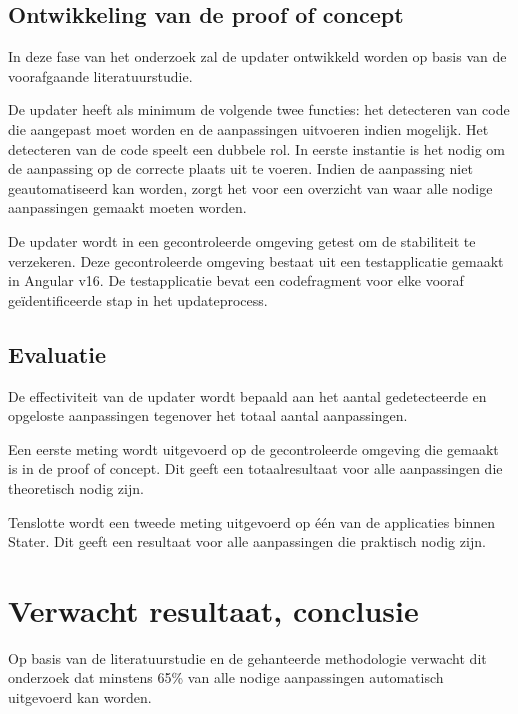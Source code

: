 \subsection{Ontwikkeling van de proof of concept}

In deze fase van het onderzoek zal de updater ontwikkeld worden op basis van de voorafgaande literatuurstudie.

De updater heeft als minimum de volgende twee functies: het detecteren van code die aangepast moet worden en de aanpassingen uitvoeren indien mogelijk.
Het detecteren van de code speelt een dubbele rol.
In eerste instantie is het nodig om de aanpassing op de correcte plaats uit te voeren.
Indien de aanpassing niet geautomatiseerd kan worden, zorgt het voor een overzicht van waar alle nodige aanpassingen gemaakt moeten worden.

De updater wordt in een gecontroleerde omgeving getest om de stabiliteit te verzekeren.
Deze gecontroleerde omgeving bestaat uit een testapplicatie gemaakt in Angular v16.
De testapplicatie bevat een codefragment voor elke vooraf geïdentificeerde stap in het updateprocess.

\subsection{Evaluatie}

De effectiviteit van de updater wordt bepaald aan het aantal gedetecteerde en opgeloste aanpassingen tegenover het totaal aantal aanpassingen.

Een eerste meting wordt uitgevoerd op de gecontroleerde omgeving die gemaakt is in de proof of concept.
Dit geeft een totaalresultaat voor alle aanpassingen die theoretisch nodig zijn.

Tenslotte wordt een tweede meting uitgevoerd op één van de applicaties binnen Stater.
Dit geeft een resultaat voor alle aanpassingen die praktisch nodig zijn.

\section{Verwacht resultaat, conclusie}
\label{sec:verwachte_resultaten}

Op basis van de literatuurstudie en de gehanteerde methodologie verwacht dit onderzoek dat minstens 65\% van alle nodige aanpassingen automatisch uitgevoerd kan worden.

